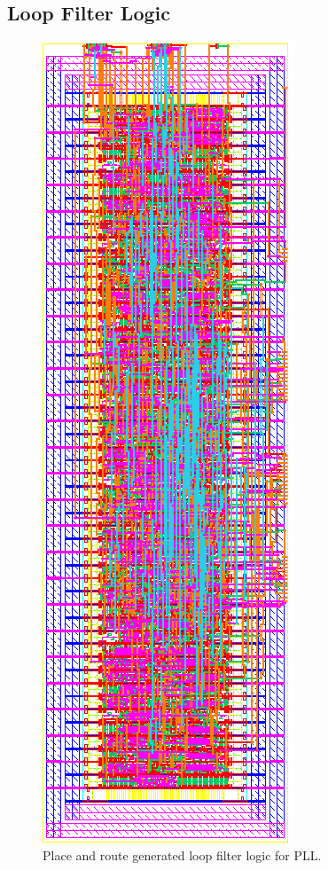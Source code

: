 		\subsection{Loop Filter Logic}
			\begin{figure}[htb!]
			        \centering
			        \includegraphics[height=0.8\textheight, angle=0]{./figs/layout/final_logic}
			    \caption{Place and route generated loop filter logic for PLL.}
			\end{figure}
		\FloatBarrier\pagebreak

